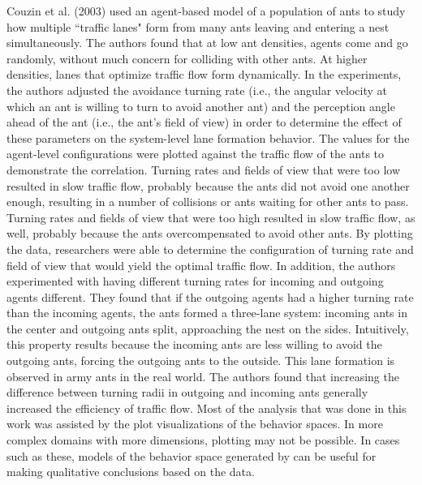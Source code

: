 Couzin et al. (2003)\nocite{couzin2003sol} used an agent-based model of a population of ants to study how multiple ``traffic lanes" form  from many ants leaving and entering a nest simultaneously.
The authors found that at low ant densities, agents come and go randomly, without much concern for colliding with other ants.
At higher densities, lanes that optimize traffic flow form dynamically.
In the experiments, the authors adjusted the avoidance turning rate (i.e., the angular velocity at which an ant is willing to turn to avoid another ant) and the perception angle ahead of the ant (i.e., the ant's field of view) in order to determine the effect of these parameters on the system-level lane formation behavior.
The values for the agent-level configurations were plotted against the traffic flow of the ants to demonstrate the correlation.
Turning rates and fields of view that were too low resulted in slow traffic flow, probably because the ants did not avoid one another enough, resulting in a number of collisions or ants waiting for other ants to pass.
Turning rates and fields of view that were too high resulted in slow traffic flow, as well, probably because the ants overcompensated to avoid other ants.
By plotting the data, researchers were able to determine the configuration of turning rate and field of view that would yield the optimal traffic flow.
In addition, the authors experimented with having different turning rates for incoming and outgoing agents different.
They found that if the outgoing agents had a higher turning rate than the incoming agents, the ants formed a three-lane system: incoming ants in the center and outgoing ants split, approaching the nest on the sides.
Intuitively, this property results because the incoming ants are less willing to avoid the outgoing ants, forcing the outgoing ants to the outside.
This lane formation is observed in army ants in the real world.
The authors found that increasing the difference between turning radii in outgoing and incoming ants generally increased the efficiency of traffic flow.
Most of the analysis that was done in this work was assisted by the plot visualizations of the behavior spaces.
In more complex domains with more dimensions, plotting may not be possible.
In cases such as these, models of the behavior space generated by \fw can be useful for making qualitative conclusions based on the data.


